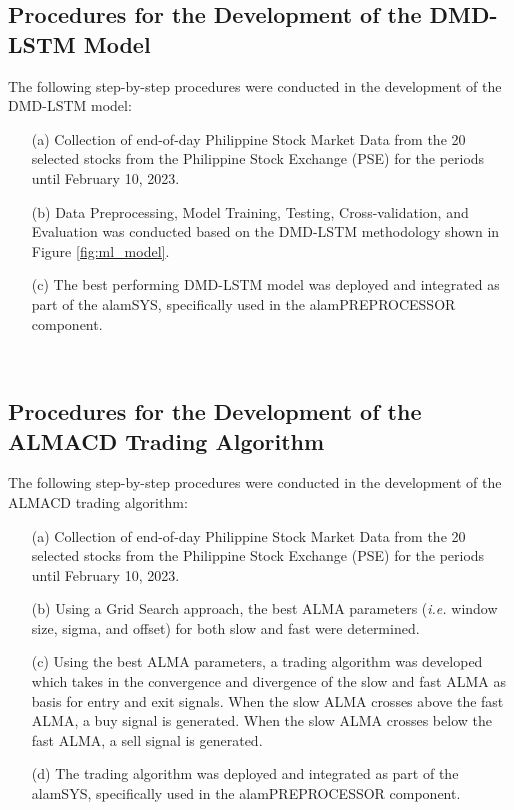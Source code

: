 \subsection{Procedures for the Development of the DMD-LSTM Model}
\label{subsec:proc_dmdlstm}
The following step-by-step procedures were conducted in the development
of the DMD-LSTM model:
\begin{itemize}
    \item[(a)] Collection of end-of-day Philippine Stock Market Data from the
    20 selected stocks from the Philippine Stock Exchange (PSE) for the periods
    until February 10, 2023.
    \item[(b)] Data Preprocessing, Model Training, Testing, Cross-validation, and Evaluation
    was conducted based on the DMD-LSTM methodology shown in Figure \ref{fig:ml_model}.
    \item[(c)] The best performing DMD-LSTM model was deployed and integrated as part 
    of the alamSYS, specifically used in the alamPREPROCESSOR component.
\end{itemize}
\hfill \\


\subsection{Procedures for the Development of the ALMACD Trading Algorithm}
\label{subsec:proc_almacd}
The following step-by-step procedures were conducted in the development
of the ALMACD trading algorithm:
\begin{itemize}
    \item[(a)] Collection of end-of-day Philippine Stock Market Data from the
    20 selected stocks from the Philippine Stock Exchange (PSE) for the periods
    until February 10, 2023.
    \item[(b)] Using a Grid Search approach, the best ALMA parameters 
    (\textit{i.e.} window size, sigma, and offset) for both slow and fast were
    determined.
    \item[(c)] Using the best ALMA parameters, a trading algorithm was developed
    which takes in the convergence and divergence of the slow and fast ALMA as basis
    for entry and exit signals. When the slow ALMA crosses above the fast ALMA, a
    buy signal is generated. When the slow ALMA crosses below the fast ALMA, a sell
    signal is generated.
    \item[(d)] The trading algorithm was deployed and integrated as part of the
    alamSYS, specifically used in the alamPREPROCESSOR component.
\end{itemize}
\hfill \\


